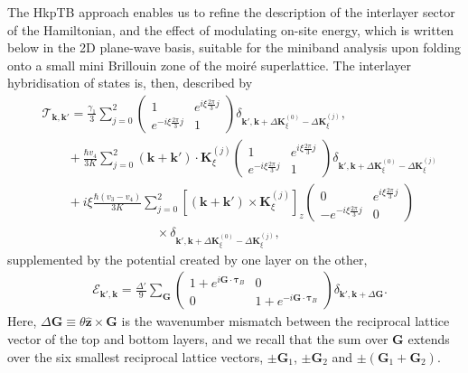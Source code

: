 \documentclass[showpacs,aps,prb,reprint,twocolumn]{revtex4-1}
\begin{document}
The HkpTB approach enables us to refine the description of the interlayer sector of the Hamiltonian, and the effect of modulating on-site energy, which is written below in the 2D plane-wave basis, suitable for the miniband analysis upon folding onto a small mini Brillouin zone of the moir\'{e} superlattice. The interlayer hybridisation of states is, then, described by
\begin{align}\label{eq:T_tBLG}
&\mathcal{T}_{\boldsymbol{k},\boldsymbol{k}'}=
\frac{\gamma_1}{3}
\sum_{j=0}^2
\left(
\begin{matrix}
1&e^{i\xi\frac{2\pi}{3}j}\\
e^{-i\xi\frac{2\pi}{3}j}&1
\end{matrix}
\right)
\delta_{\boldsymbol{k}',\boldsymbol{k}+
\Delta\boldsymbol{K}_\xi^{(0)}-
\Delta\boldsymbol{K}_\xi^{(j)}},\\
&\qquad+
\frac{\hbar v_4}{3K}
\sum_{j=0}^2(\boldsymbol{k}+\boldsymbol{k}')\cdot \boldsymbol{K}^{(j)}_\xi
\left(
\begin{matrix}
1&e^{i\xi\frac{2\pi}{3}j}\\
e^{-i\xi\frac{2\pi}{3}j}&1
\end{matrix}
\right)
\delta_{\boldsymbol{k}',\boldsymbol{k}+
\Delta\boldsymbol{K}_\xi^{(0)}-
\Delta\boldsymbol{K}_\xi^{(j)}}\nonumber\\
&\qquad+
i\xi \frac{\hbar (v_3-v_4)}{3K}
\sum_{j=0}^2
\left[(\boldsymbol{k}+\boldsymbol{k}')
\times\boldsymbol{K}^{(j)}_\xi\right]_z 
\left(
\begin{matrix}
0&e^{i\xi\frac{2\pi}{3}j}\\
-e^{-i\xi\frac{2\pi}{3}j}&0
\end{matrix}
\right)\nonumber\\
&\qquad\qquad\qquad\qquad\quad\times\delta_{\boldsymbol{k}',\boldsymbol{k}+
\Delta\boldsymbol{K}_\xi^{(0)}-
\Delta\boldsymbol{K}_\xi^{(j)}},\nonumber
\end{align}
supplemented by the potential created by one layer on the other,
\begin{align}\label{eq:E_tBLG}
&\mathcal{E}_{\boldsymbol{k}',\boldsymbol{k}}=
\frac{\Delta'}{9}
\sum_{\boldsymbol{G}}
\left(
\begin{matrix}
1+e^{i\boldsymbol{G}\cdot\boldsymbol{\tau}_B}&0\\
0&1+e^{-i\boldsymbol{G}\cdot\boldsymbol{\tau}_B}
\end{matrix}
\right)
\delta_{\boldsymbol{k}',\boldsymbol{k}+\Delta\boldsymbol{G}}.
\end{align}
Here, $\Delta\boldsymbol{G}\equiv\theta \hat{\boldsymbol{z}}\times\boldsymbol{G}$ is the wavenumber mismatch between the reciprocal lattice vector of the top and bottom layers, and we recall that the sum over $\boldsymbol{G}$ extends over the six smallest reciprocal lattice vectors, $\pm\boldsymbol{G}_1$, $\pm\boldsymbol{G}_2$ and $\pm(\boldsymbol{G}_1+\boldsymbol{G}_2)$.
\end{document}
